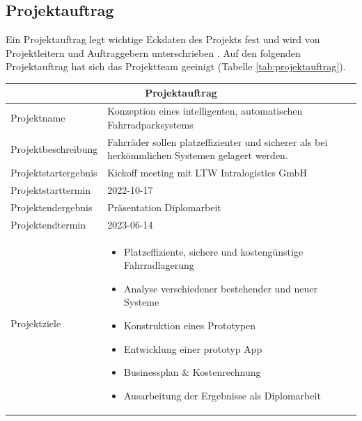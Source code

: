 \subsection{Projektauftrag}

Ein Projektauftrag legt wichtige Eckdaten des Projekts fest und wird von Projektleitern und Auftraggebern unterschrieben . Auf den folgenden Projektauftrag hat sich das Projektteam geeinigt (Tabelle \ref{tab:projektauftrag}).

\begin{longtable}{p{}|p{}}
  \multicolumn{2}{c}{\textbf{Projektauftrag}}                                                                                 \\
  \toprule

  Projektname                & Konzeption eines intelligenten, automatischen Fahrradparksystems                               \\ \midrule

  Projektbeschreibung        & Fahrräder sollen platzeffizienter und sicherer als bei herkömmlichen Systemen gelagert werden. \\ \midrule

  Projektstartergebnis       & Kickoff meeting mit LTW Intralogistics GmbH                                                    \\ \midrule

  Projektstarttermin         & 2022-10-17                                                                                     \\ \midrule

  Projektendergebnis         & Präsentation Diplomarbeit                                                                      \\ \midrule

  Projektendtermin           & 2023-06-14                                                                                     \\ \midrule

  Projektziele               &
  \begin{itemize}
    \item Platzeffiziente, sichere und kostengünstige Fahrradlagerung
    \item Analyse verschiedener bestehender und neuer Systeme
    \item Konstruktion eines Prototypen
    \item Entwicklung einer prototyp App
    \item Businessplan \& Kostenrechnung
    \item Ausarbeitung der Ergebnisse als Diplomarbeit
  \end{itemize}                                                            \\  \midrule


\end{longtable}
